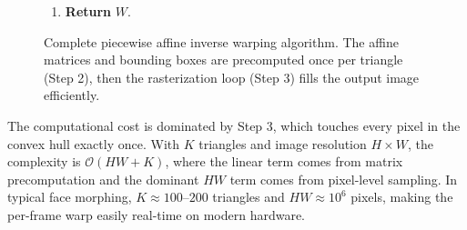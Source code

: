 \begin{figure}[h]
{\begin{minipage}{0.9\textwidth}
\begin{enumerate}
\begin{enumerate}
\begin{enumerate}
\begin{enumerate}
                \item Sample source: $C = \text{BilinearInterp}(I, x_s, y_s)$.
                \item Write output: $W(x, y) \gets C$.
            \end{enumerate}
        \end{enumerate}
    \end{enumerate}
    \item \textbf{Return} $W$.
\end{enumerate}
\end{minipage}}
\caption{Complete piecewise affine inverse warping algorithm. The affine matrices and bounding boxes are precomputed once per triangle (Step 2), then the rasterization loop (Step 3) fills the output image efficiently.}
\label{alg:piecewise-warp}
\end{figure}

The computational cost is dominated by Step 3, which touches every pixel in the convex hull exactly once. With $K$ triangles and image resolution $H \times W$, the complexity is $\mathcal{O}(HW + K)$, where the linear term comes from matrix precomputation and the dominant $HW$ term comes from pixel-level sampling. In typical face morphing, $K \approx 100\text{--}200$ triangles and $HW \approx 10^6$ pixels, making the per-frame warp easily real-time on modern hardware.